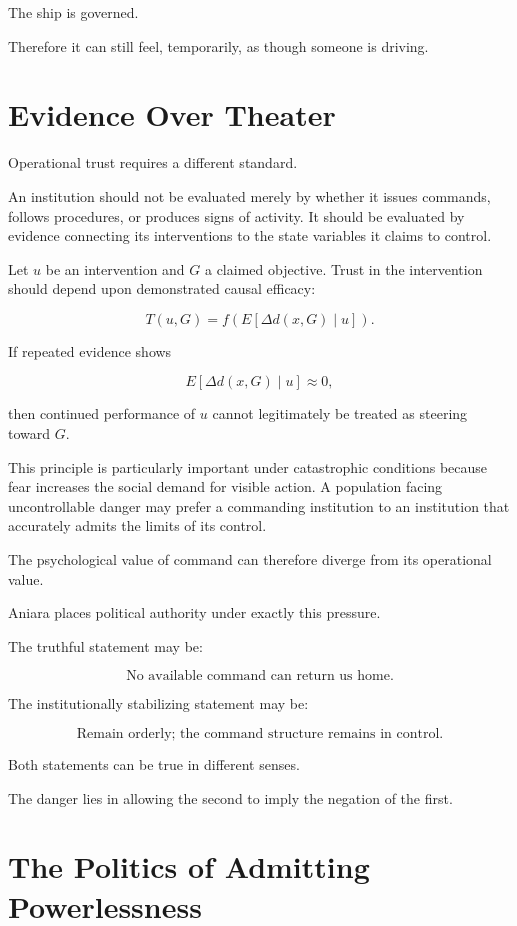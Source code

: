 \documentclass[11pt,oneside]{book}
\theoremstyle{definition}
\theoremstyle{remark}
\begin{document}
The ship is governed.

Therefore it can still feel, temporarily, as though someone is driving.

\section{Evidence Over Theater}

Operational trust requires a different standard.

An institution should not be evaluated merely by whether it issues commands, follows procedures, or produces signs of activity. It should be evaluated by evidence connecting its interventions to the state variables it claims to control.

Let \(u\) be an intervention and \(G\) a claimed objective. Trust in the intervention should depend upon demonstrated causal efficacy:

\[
T(u,G)
=
f\!\left(
E[
\Delta d(x,G)\mid u
]
\right).
\]

If repeated evidence shows

\[
E[
\Delta d(x,G)\mid u
]
\approx0,
\]

then continued performance of \(u\) cannot legitimately be treated as steering toward \(G\).

This principle is particularly important under catastrophic conditions because fear increases the social demand for visible action. A population facing uncontrollable danger may prefer a commanding institution to an institution that accurately admits the limits of its control.

The psychological value of command can therefore diverge from its operational value.

Aniara places political authority under exactly this pressure.

The truthful statement may be:

\[
\text{No available command can return us home.}
\]

The institutionally stabilizing statement may be:

\[
\text{Remain orderly; the command structure remains in control.}
\]

Both statements can be true in different senses.

The danger lies in allowing the second to imply the negation of the first.

\section{The Politics of Admitting Powerlessness}
\end{document}
